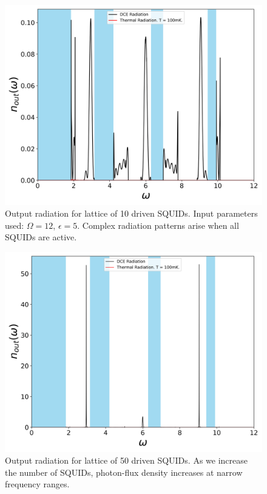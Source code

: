 \begin{figure}[h]
    \includegraphics[width=\textwidth, keepaspectratio]{figures/results/10_SQUIDs_active.png}
    \caption{Output radiation for lattice of 10 driven SQUIDs. Input parameters used: $\Omega=12$, $\epsilon=5$. Complex radiation patterns arise when all SQUIDs are active.}
    \label{fig:10_SQUIDs_active}
\end{figure}
%
\begin{figure}[h]
    \includegraphics[width=\textwidth, keepaspectratio]{figures/results/50_SQUIDs_active.png}
    \caption{Output radiation for lattice of 50 driven SQUIDs. As we increase the number of SQUIDs, photon-flux density increases at narrow frequency ranges.}
    \label{fig:50_SQUIDs_active}
\end{figure}
